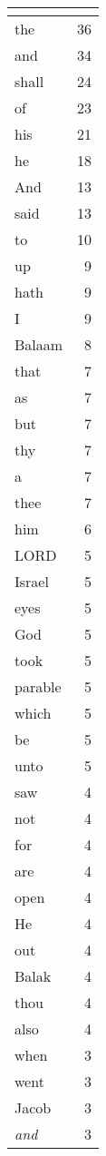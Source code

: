 \begin{center}
\begin{longtable}{l|r}
\hline \multicolumn{2}{c}{{ }} \\ \hline
\endfoot 
the & 36\\ \hline 
and & 34\\ \hline 
shall & 24\\ \hline 
of & 23\\ \hline 
his & 21\\ \hline 
he & 18\\ \hline 
And & 13\\ \hline 
said & 13\\ \hline 
to & 10\\ \hline 
up & 9\\ \hline 
hath & 9\\ \hline 
I & 9\\ \hline 
Balaam & 8\\ \hline 
that & 7\\ \hline 
as & 7\\ \hline 
but & 7\\ \hline 
thy & 7\\ \hline 
a & 7\\ \hline 
thee & 7\\ \hline 
him & 6\\ \hline 
LORD & 5\\ \hline 
Israel & 5\\ \hline 
eyes & 5\\ \hline 
God & 5\\ \hline 
took & 5\\ \hline 
parable & 5\\ \hline 
which & 5\\ \hline 
be & 5\\ \hline 
unto & 5\\ \hline 
saw & 4\\ \hline 
not & 4\\ \hline 
for & 4\\ \hline 
are & 4\\ \hline 
open & 4\\ \hline 
He & 4\\ \hline 
out & 4\\ \hline 
Balak & 4\\ \hline 
thou & 4\\ \hline 
also & 4\\ \hline 
when & 3\\ \hline 
went & 3\\ \hline 
Jacob & 3\\ \hline 
\emph{and} & 3\\ \hline 

\end{longtable}
\end{center}
